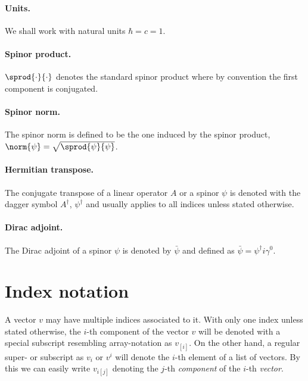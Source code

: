 \paragraph{Units.}
We shall work with natural units $\hbar = c = 1$.

\paragraph{Spinor product.}
$\sprod{\cdot}{\cdot}$ denotes the standard spinor product where by convention the first component is conjugated.

\paragraph{Spinor norm.}
The spinor norm is defined to be the one induced by the spinor product, $\norm{\psi} = \sqrt{\sprod{\psi}{\psi}}$.

\paragraph{Hermitian transpose.}
The conjugate transpose of a linear operator $A$ or a spinor $\psi$ is denoted with the dagger symbol $A^\dagger$, $\psi^\dagger$ and usually applies to all indices unless stated otherwise.

\paragraph{Dirac adjoint.}
The Dirac adjoint of a spinor $\psi$ is denoted by $\bar{\psi}$ and defined as $\bar{\psi} = \psi^\dagger i \gamma^0$.

\section{Index notation}
\label{sec:notation:index}

A vector $v$ may have multiple indices associated to it.
With only one index unless stated otherwise, the $i$-th component of the vector $v$ will be denoted with a special subscript resembling array-notation as $v_{[i]}$.
On the other hand, a regular super- or subscript as $v_i$ or $v^{i}$ will denote the $i$-th element of a list of vectors.
By this we can easily write $v_{i [j]}$ denoting the $j$-th \emph{component} of the $i$-th \emph{vector}.

